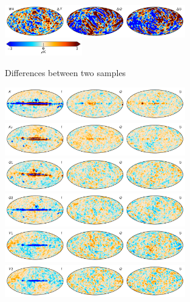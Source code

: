 \documentclass[twocolumn]{../../common/aa}
\begin{document}
\begin{figure}
	\includegraphics[width=0.7\textwidth]{figures/090-WMAP_W4_sampdiff.pdf}\\
	\includegraphics[width=0.30\textwidth]{figures/cbar_3uK.pdf}
	\caption{Differences between two samples}
        \label{fig:sampdiff}
\end{figure}
\begin{figure}
	\centering
	\includegraphics[width=0.7\textwidth]{figures/tod_res_K_IQU.pdf}\\
	\includegraphics[width=0.7\textwidth]{figures/tod_res_Ka_IQU.pdf}\\
	\includegraphics[width=0.7\textwidth]{figures/tod_res_Q1_IQU.pdf}\\
	\includegraphics[width=0.7\textwidth]{figures/tod_res_Q2_IQU.pdf}\\
	\includegraphics[width=0.7\textwidth]{figures/tod_res_V1_IQU.pdf}\\
	\includegraphics[width=0.7\textwidth]{figures/tod_res_V2_IQU.pdf}\\

\end{figure}
\end{document}
